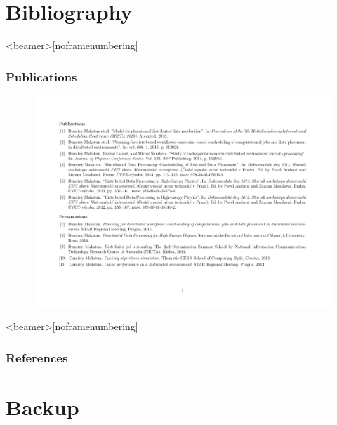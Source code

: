 \documentclass{beamer}
\begin{document}
\section*{Bibliography}
\begin{frame}<beamer>[noframenumbering]\frametitle{Publications }
\begin{figure}
	\begin{center}
		\centering
		\includegraphics[trim = 20mm 20mm 20mm 20mm,clip,width=\textwidth]{myref.pdf}
	\end{center}
\end{figure}	
\end{frame}

\begin{frame}<beamer>[noframenumbering]\frametitle{References}
\nocite{Rudova}
\renewcommand*{\bibfont}{\tiny}
\printbibliography[notkeyword=my]
\end{frame}

\section*{Backup}
\end{document}
